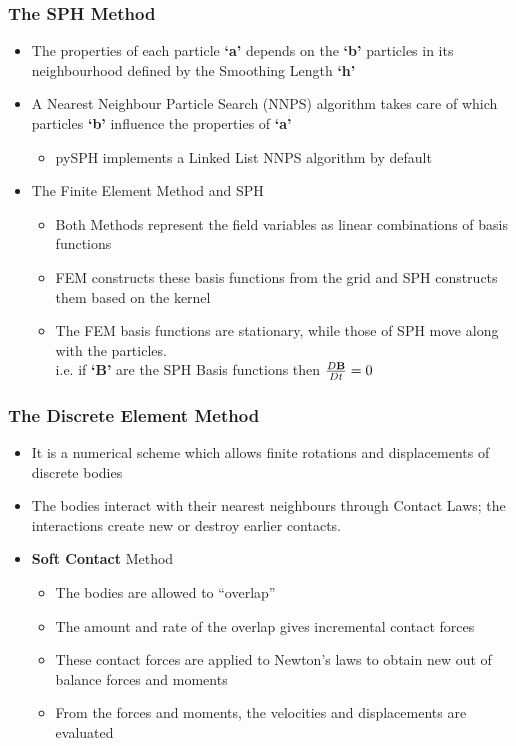 \documentclass{beamer}
\begin{document}
%  
 \begin{frame} %
  \frametitle{The SPH Method}
  \begin{itemize}
   \item The properties of each particle {\bf{`a'}} depends on the {\bf{`b'}} particles in its neighbourhood defined by the Smoothing Length {\bf{`h'}} \pause
   \item A Nearest Neighbour Particle Search (NNPS) algorithm takes care of which particles {\bf{`b'}} influence the properties of {\bf{`a'}} \pause
   \begin{itemize}
    \item pySPH implements a Linked List NNPS algorithm by default\pause
   \end{itemize}
   \item The Finite Element Method and SPH
   \begin{itemize}
    \item Both Methods represent the field variables as linear combinations of basis functions \pause
    \item FEM constructs these basis functions from the grid and SPH constructs them based on the kernel \pause
    \item The FEM basis functions are stationary, while those of SPH move along with the particles.\\
    i.e. if {\bf{`B'}} are the SPH Basis functions then $\frac{D{\bf{B}}}{Dt} = 0$ 
   \end{itemize}
  \end{itemize}
 \end{frame}

 \begin{frame} %
  \frametitle{The Discrete Element Method}
  \begin{itemize}
   \item It is a numerical scheme which allows finite rotations and displacements of discrete bodies
   \item The bodies interact with their nearest neighbours through Contact Laws; the interactions create new or destroy earlier contacts.
   \item {\bf{Soft Contact}} Method
   \begin{itemize}
    \item The bodies are allowed to ``overlap''
    \item The amount and rate of the overlap gives incremental contact forces
    \item These contact forces are applied to Newton's laws to obtain new out of balance forces and moments
    \item From the forces and moments, the velocities and displacements are evaluated
   \end{itemize}
  \end{itemize}
 \end{frame}
\end{document}
